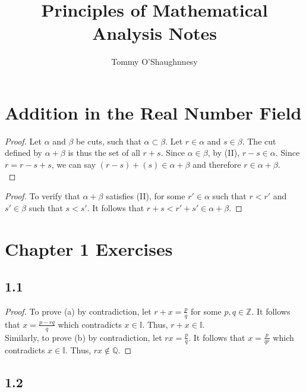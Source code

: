 \documentclass[12pt]{article}
\author{Tommy O'Shaughnnesy}
\title{Principles of Mathematical Analysis Notes}
\begin{document}
\maketitle
\section{Addition in the Real Number Field}
\begin{proof}
Let $\alpha$ and $\beta$ be cuts, such that $\alpha\subset\beta$. 
Let $r\in\alpha$ and $s\in\beta$. The cut defined by $\alpha+\beta$ is thus the set of all $r+s$. 
Since $\alpha\in\beta$, by (II), $r-s\in\alpha$. Since $r=r-s+s$, we can say $(r-s)+(s)
\in\alpha+\beta$ and therefore $r\in\alpha+\beta$.\\
\end{proof}

\begin{proof}
To verify that $\alpha + \beta$ satisfies (II), for some $r' \in \alpha$ such that $r < r'$ and 
$s' \in \beta$ such that $s < s'$. It follows that $r + s < r' + s' \in \alpha + \beta$.
\end{proof}
\section{Chapter 1 Exercises}
\subsection{1.1}
\begin{proof}
				To prove (a) by contradiction, let $r + x = \frac{p}{q}$ for some $p,q \in \mathbb{Z}$.
				It follows that $x = \frac{p-rq}{q}$ which contradicts $x \in \mathbb{I}$.
				Thus, $r + x \in \mathbb{I}$. \\
				Similarly, to prove (b) by contradiction,
				let $rx = \frac{p}{q}$. It follows that $x = \frac{p}{qr}$ 
				which contradicts $x \in \mathbb{I}$. Thus, $rx \notin \mathbb{Q}$.
\end{proof}
\subsection{1.2}
\end{document}
